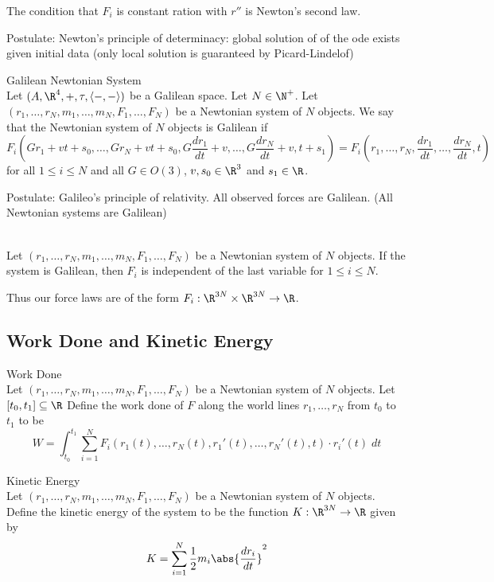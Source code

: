 \documentclass[a4paper]{article}
\begin{document}
The condition that $F_i$ is constant ration with $r''$ is Newton's second law. 

Postulate: Newton's principle of determinacy: global solution of of the ode exists given initial data (only local solution is guaranteed by Picard-Lindelof)

\begin{defn}{Galilean Newtonian System}{}\\
Let $(A,\R^4,+,\tau,\langle-,-\rangle)$ be a Galilean space. Let $N\in\N^+$. Let $(r_1,\dots,r_N,m_1,\dots,m_N,F_1,\dots,F_N)$ be a Newtonian system of $N$ objects. We say that the Newtonian system of $N$ objects is Galilean if $$F_i\left(Gr_1+vt+s_0,\dots,Gr_N+vt+s_0,G\frac{dr_1}{dt}+v,\dots,G\frac{dr_N}{dt}+v,t+s_1\right)=F_i\left(r_1,\dots,r_N,\frac{dr_1}{dt},\dots,\frac{dr_N}{dt},t\right)$$ for all $1\leq i\leq N$ and all $G\in O(3)$, $v,s_0\in\R^3$ and $s_1\in\R$. 
\end{defn}

Postulate: Galileo's principle of relativity. All observed forces are Galilean. (All Newtonian systems are Galilean)

\begin{lmm}{}{}\\
Let $(r_1,\dots,r_N,m_1,\dots,m_N,F_1,\dots,F_N)$ be a Newtonian system of $N$ objects. If the system is Galilean, then $F_i$ is independent of the last variable for $1\leq i\leq N$. 
\end{lmm}

Thus our force laws are of the form $F_i:\R^{3N}\times\R^{3N}\to\R$. 

\subsection{Work Done and Kinetic Energy}
\begin{defn}{Work Done}{}\\
Let $(r_1,\dots,r_N,m_1,\dots,m_N,F_1,\dots,F_N)$ be a Newtonian system of $N$ objects. Let $[t_0,t_1]\subseteq\R$ Define the work done of $F$ along the world lines $r_1,\dots,r_N$ from $t_0$ to $t_1$ to be $$W=\int_{t_0}^{t_1}\sum_{i=1}^NF_i(r_1(t),\dots,r_N(t),r_1'(t),\dots,r_N'(t),t)\cdot r_i'(t)\;dt$$
\end{defn}

\begin{defn}{Kinetic Energy}{}\\
Let $(r_1,\dots,r_N,m_1,\dots,m_N,F_1,\dots,F_N)$ be a Newtonian system of $N$ objects. Define the kinetic energy of the system to be the function $K:\R^{3N}\to\R$ given by $$K=\sum_{i=1}^N\frac{1}{2}m_i\abs{\frac{dr_i}{dt}}^2$$
\end{defn}
\end{document}
